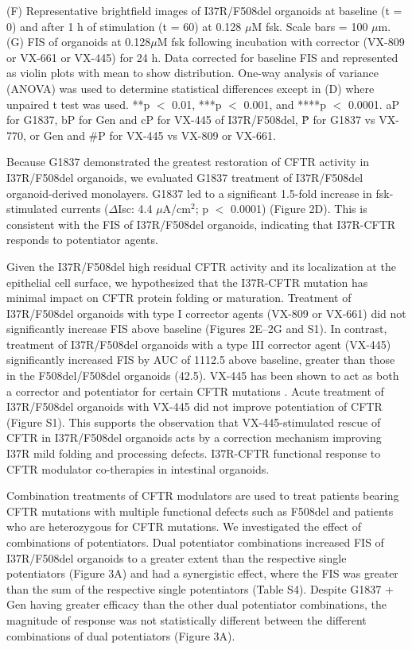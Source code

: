 {(F) Representative brightfield images of I37R/F508del organoids at baseline (t = 0) and after 1 h of stimulation (t = 60) at 0.128 $\mu$M fsk. Scale bars = 100 $\mu$m.\\

(G) FIS of organoids at 0.128$\mu$M fsk following incubation with corrector (VX-809 or VX-661 or VX-445) for 24 h. Data corrected for baseline FIS and represented as violin plots with mean to show distribution. One-way analysis of variance (ANOVA) was used to determine statistical differences except in (D) where unpaired t test was used. **p $<$ 0.01, ***p $<$ 0.001, and ****p $<$ 0.0001. aP for G1837, bP for Gen and cP for VX-445 of I37R/F508del, \^P for G1837 vs VX-770, or Gen and \#P for VX-445 vs VX-809 or VX-661.\\
}
\endgroup

Because G1837 demonstrated the greatest restoration of CFTR activity in I37R/F508del organoids, we evaluated G1837 treatment of I37R/F508del organoid-derived monolayers. G1837 led to a significant 1.5-fold increase in fsk-stimulated currents ($\Delta$Isc: 4.4 $\mu$A/cm$^2$; p $<$ 0.0001) (Figure 2D). This is consistent with the FIS of I37R/F508del organoids, indicating that I37R-CFTR responds to potentiator agents.

Given the I37R/F508del high residual CFTR activity and its localization at the epithelial cell surface, we hypothesized that the I37R-CFTR mutation has minimal impact on CFTR protein folding or maturation. Treatment of I37R/F508del organoids with type I corrector agents (VX-809 or VX-661) did not significantly increase FIS above baseline (Figures 2E–2G and S1). In contrast, treatment of I37R/F508del organoids with a type III corrector agent (VX-445) significantly increased FIS by AUC of 1112.5 above baseline, greater than those in the F508del/F508del organoids (42.5). VX-445 has been shown to act as both a corrector and potentiator for certain CFTR mutations \cite{laselva2021,shaughnessy2021,veit2021}. Acute treatment of I37R/F508del organoids with VX-445 did not improve potentiation of CFTR (Figure S1). This supports the observation that VX-445-stimulated rescue of CFTR in I37R/F508del organoids acts by a correction mechanism improving I37R mild folding and processing defects. I37R-CFTR functional response to CFTR modulator co-therapies in intestinal organoids.

Combination treatments of CFTR modulators are used to treat patients bearing CFTR mutations with multiple functional defects such as F508del and patients who are heterozygous for CFTR mutations. We investigated the effect of combinations of potentiators. Dual potentiator combinations increased FIS of I37R/F508del organoids to a greater extent than the respective single potentiators (Figure 3A) and had a synergistic effect, where the FIS was greater than the sum of the respective single potentiators (Table S4). Despite G1837 + Gen having greater efficacy than the other dual potentiator combinations, the magnitude of response was not statistically different between the different combinations of dual potentiators (Figure 3A).


